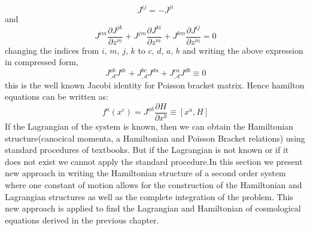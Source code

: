 \documentclass[14pt]{extarticle}
\begin{document}
\begin{equation}
J^{i j}=-J^{j i}
\end{equation}
and\\
\begin{equation}
J^{i m}\frac{\partial J^{j k}}{ \partial z^{m}} + J^{j m}\frac{\partial J^{k i}}{ \partial z^{m}} + J^{k m}\frac{\partial J^{i j}}{ \partial z^{m}} = 0
\end{equation}
changing the indices from $i$, $m$, $j$, $k$ to $c$, $d$, $a$, $b$ and writing the above expression in compressed form,\\
\begin{equation}
J_{, d}^{a b} J^{d c}+J_{, d}^{b c} J^{d a}+J_{, d}^{c a} J^{d b} \equiv 0
\end{equation}
this is the well known Jacobi identity for Poisson bracket matrix. Hence hamilton equations can be written as:\\
\begin{equation}
f^{a}\left(x^{c}\right)=J^{a b} \frac{\partial H}{\partial x^{b}} \equiv\left[x^{a}, H\right]
\end{equation}
If the Lagrangian of the system is known, then we can obtain the Hamiltonian structure(canocical momenta, a Hamiltonian and Poisson Bracket relations) using standard procedures of textbooks. But if the Lagrangian is not known or if it does not exist we cannot apply the standard procedure.In this section we present new approach in writing the Hamiltonian structure of a second order system where one constant of motion allows for the construction of the Hamiltonian and Lagrangian structures as well as the complete integration of the problem. This new approach is applied to find the Lagrangian and Hamiltonian of cosmological equations derived in the previous chapter.\\
\end{document}
